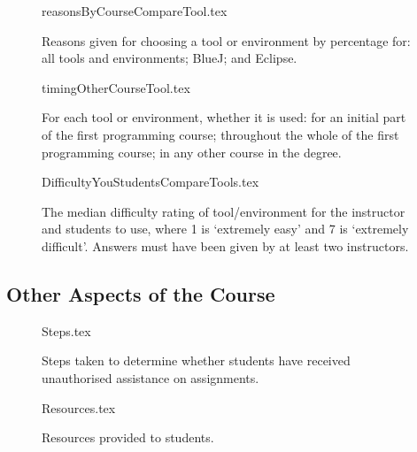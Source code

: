 \documentclass{sig-alternate}
\begin{document}
\begin{figure}
\begin{center}
{reasonsByCourseCompareTool.tex}
\end{center}
\caption{Reasons given for choosing a tool or environment by percentage for: all tools and environments; BlueJ; and Eclipse.}
\end{figure}

\begin{figure}
\begin{center}
{timingOtherCourseTool.tex}
\end{center}
\caption{For each tool or environment, whether it is used: for an initial part of the first programming course; throughout the whole of the first programming course; in any other course in the degree.}
\end{figure}


\begin{figure}
\begin{center}
{DifficultyYouStudentsCompareTools.tex}
\end{center}
\caption{The median difficulty rating of tool/environment for the instructor and students to use, where 1 is `extremely easy' and 7 is `extremely difficult'.  Answers must have been given by at least two instructors.}
\end{figure}

\subsection{Other Aspects of the Course}

\begin{figure}
\begin{center}
{Steps.tex}
\end{center}
\caption{Steps taken to determine whether students have received unauthorised assistance on assignments.}
\end{figure}

\begin{figure}
\begin{center}
{Resources.tex}
\end{center}
\caption{Resources provided to students.}
\end{figure}
\end{document}

